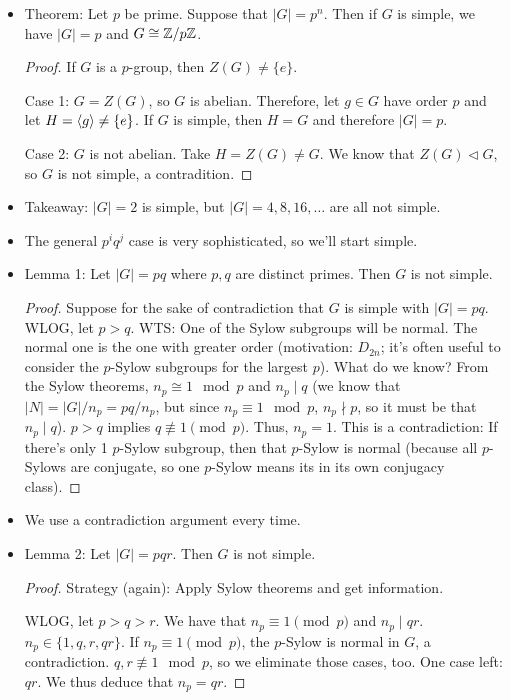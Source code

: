 \documentclass[../notes.tex]{subfiles}
\begin{document}
\begin{itemize}
    \item Theorem: Let $p$ be prime. Suppose that $|G|=p^n$. Then if $G$ is simple, we have $|G|=p$ and $G\cong\mathbb{Z}/p\mathbb{Z}$.
    \begin{proof}
        If $G$ is a $p$-group, then $Z(G)\neq\{e\}$.\par
        Case 1: $G=Z(G)$, so $G$ is abelian. Therefore, let $g\in G$ have order $p$ and let $H=\left\langle{g}\right\rangle\neq\{e\}$. If $G$ is simple, then $H=G$ and therefore $|G|=p$.\par
        Case 2: $G$ is not abelian. Take $H=Z(G)\neq G$. We know that $Z(G)\triangleleft G$, so $G$ is not simple, a contradition.
    \end{proof}
    \item Takeaway: $|G|=2$ is simple, but $|G|=4,8,16,\dots$ are all not simple.
    \item The general $p^iq^j$ case is very sophisticated, so we'll start simple.
    \item Lemma 1: Let $|G|=pq$ where $p,q$ are distinct primes. Then $G$ is not simple.
    \begin{proof}
        Suppose for the sake of contradiction that $G$ is simple with $|G|=pq$. WLOG, let $p>q$.
        WTS: One of the Sylow subgroups will be normal. The normal one is the one with greater order (motivation: $D_{2n}$; it's often useful to consider the $p$-Sylow subgroups for the largest $p$).
        What do we know? From the Sylow theorems, $n_p\cong 1\mod p$ and $n_p\mid q$ (we know that $|N|=|G|/n_p=pq/n_p$, but since $n_p\equiv 1\mod p$, $n_p\nmid p$, so it must be that $n_p\mid q$). $p>q$ implies $q\not\equiv 1\pmod p$. Thus, $n_p=1$. This is a contradiction: If there's only 1 $p$-Sylow subgroup, then that $p$-Sylow is normal (because all $p$-Sylows are conjugate, so one $p$-Sylow means its in its own conjugacy class).
    \end{proof}
    \item We use a contradiction argument every time.
    \item Lemma 2: Let $|G|=pqr$. Then $G$ is not simple.
    \begin{proof}
        Strategy (again): Apply Sylow theorems and get information.\par
        WLOG, let $p>q>r$. We have that $n_p\equiv 1\pmod p$ and $n_p\mid qr$. $n_p\in\{1,q,r,qr\}$. If $n_p\equiv 1\pmod p$, the $p$-Sylow is normal in $G$, a contradiction. $q,r\not\equiv 1\mod p$, so we eliminate those cases, too. One case left: $qr$. We thus deduce that $n_p=qr$.\par

\end{proof}
\end{itemize}
\end{document}
